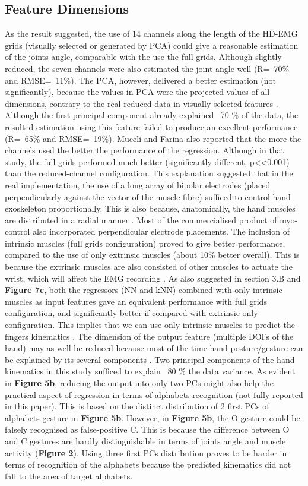 \documentclass[conference]{IEEEtran}
\begin{document}
\subsection{Feature Dimensions}
As the result suggested, the use of 14 channels along the length of the HD-EMG grids (visually selected 
or generated by PCA) could give a reasonable estimation of the joints angle, comparable with the use the 
full grids. Although slightly reduced, the seven channels were also estimated the joint angle well (R=~70\% 
and RMSE=~11\%). The PCA, however, delivered a better estimation (not significantly), because the values 
in PCA were the projected values of all dimensions, contrary to the real reduced data in visually selected 
features \cite{b37}. Although the first principal component already explained ~70 \% of the data, the resulted 
estimation using this feature failed to produce an excellent performance (R=~65\% and RMSE=~19\%). 
Muceli and Farina \cite{b9} also reported that the more the channels used the better the performance of the 
regression. Although in that study, the full grids performed much better (significantly different, p<<0.001) 
than the reduced-channel configuration.
This explanation suggested that in the real implementation, the use of a long array of bipolar electrodes 
(placed perpendicularly against the vector of the muscle fibre) sufficed to control hand exoskeleton 
proportionally. This is also because, anatomically, the hand muscles are distributed in a radial manner \cite{b38}. 
Most of the commercialised product of myo-control also incorporated perpendicular electrode placements.
The inclusion of intrinsic muscles (full grids configuration) proved to give better performance, 
compared to the use of only extrinsic muscles (about 10\% better overall). This is because the extrinsic 
muscles are also consisted of other muscles to actuate the wrist, which will affect the EMG recording \cite{b39}.
As also suggested in section 3.B and \textbf{Figure 7c}, both the regressors (NN and kNN) combined with only 
intrinsic muscles as input features gave an equivalent performance with full grids configuration, and 
significantly better if compared with extrinsic only configuration. This implies that we can use only intrinsic 
muscles to predict the fingers kinematics \cite{b22}.
The dimension of the output feature (multiple DOFs of the hand) may as well be reduced because most 
of the time hand posture/gesture can be explained by its several components \cite{b32}\cite{b28}. Two principal 
components of the hand kinematics in this study sufficed to explain ~80 \% the data variance. As evident in 
\textbf{Figure 5b}, reducing the output into only two PCs might also help the practical aspect of regression in terms 
of alphabets recognition (not fully reported in this paper). This is based on the distinct distribution of 2 first 
PCs of alphabets gesture in \textbf{Figure 5b}. However, in \textbf{Figure 5b}, the O gesture could be falsely recognised as 
false-positive C. This is because the difference between O and C gestures are hardly distinguishable in terms 
of joints angle and muscle activity (\textbf{Figure 2}). Using three first PCs distribution proves to be 
harder in terms of recognition of the alphabets because the predicted kinematics did not fall to the area of 
target alphabets.
\end{document}
